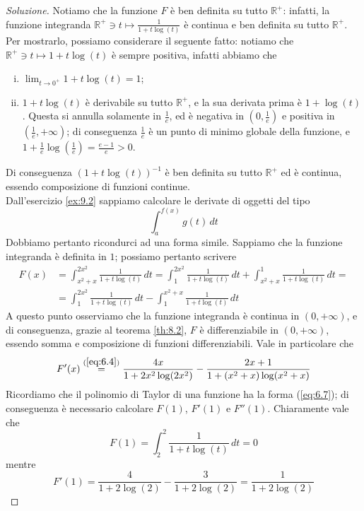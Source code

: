\begin{proof}[Soluzione]
    Notiamo che la funzione $F$ è ben definita su tutto $\mathbb{R}^+$: infatti, la funzione integranda $\mathbb{R}^+\ni t \mapsto \frac{1}{1+t\log(t)}$ è continua e ben definita su tutto $\mathbb{R}^+$. Per mostrarlo, possiamo considerare il seguente fatto: notiamo che $\mathbb{R}^+\ni t\mapsto 1+t\log(t)$ è sempre positiva, infatti abbiamo che
    \begin{enumerate}[(i)]
        \item $\lim_{t\to 0^+} 1+t\log(t)=1$;
        \item $1+t\log(t)$ è derivabile su tutto $\mathbb{R}^+$, e la sua derivata prima è $1+\log(t)$. Questa si annulla solamente in $\frac{1}{e}$, ed è negativa in $\left(0, \frac{1}{e}\right)$ e positiva in $\left(\frac{1}{e}, +\infty\right)$; di conseguenza $\frac{1}{e}$ è un punto di minimo globale della funzione, e $1+\frac{1}{e}\log\left(\frac{1}{e}\right)=\frac{e-1}{e}>0$.
    \end{enumerate}
    Di conseguenza $(1+t\log(t))^{-1}$ è ben definita su tutto $\mathbb{R}^+$ ed è continua, essendo composizione di funzioni continue.\\
    Dall'esercizio \ref{ex:9.2} sappiamo calcolare le derivate di oggetti del tipo
    \[
    \int_{a}^{f(x)} g(t)\, dt
    \]
    Dobbiamo pertanto ricondurci ad una forma simile. Sappiamo che la funzione integranda è definita in $1$; possiamo pertanto scrivere
    \[
    \begin{split}
        F(x) & = \int_{x^2+x}^{2x^2}\frac{1}{1+t\log(t)}\, dt = \int_{1}^{2x^2}\frac{1}{1+t\log(t)}\, dt + \int_{x^2+x}^1\frac{1}{1+t\log(t)}\, dt = \\
        & = \int_1^{2x^2} \frac{1}{1+t\log(t)}\, dt -\int_1^{x^2+x}\frac{1}{1+t\log(t)}\, dt
    \end{split}
    \]
    A questo punto osserviamo che la funzione integranda è continua in $(0,+\infty)$, e di conseguenza, grazie al teorema \ref{th:8.2}, $F$ è differenziabile in $(0,+\infty)$, essendo somma e composizione di funzioni differenziabili. Vale in particolare che
    \[
    F'(x) \overset{(\ref{eq:6.4})}{=} \frac{4x}{1+2x^2\log(2x^2)} -\frac{2x+1}{1+(x^2+x)\log(x^2+x)}
    \]
    Ricordiamo che il polinomio di Taylor di una funzione ha la forma (\ref{eq:6.7}); di conseguenza è necessario calcolare $F(1)$, $F'(1)$ e $F''(1)$. Chiaramente vale che
    \[
    F(1) = \int_2^2 \frac{1}{1+t\log(t)}\, dt = 0
    \]
    mentre
    \[
    F'(1) = \frac{4}{1+2\log(2)}-\frac{3}{1+2\log(2)} = \frac{1}{1+2\log(2)}
\]
\end{proof}
